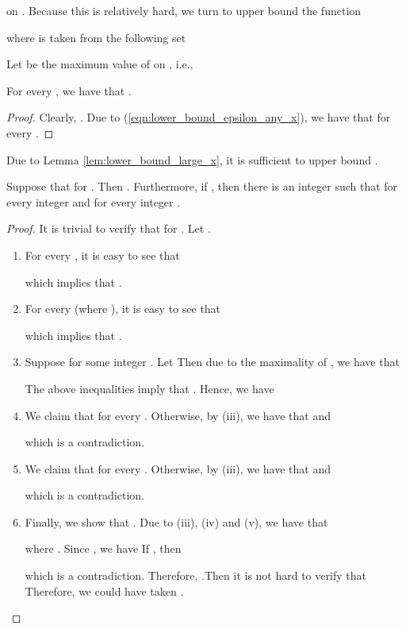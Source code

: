 \documentclass[JMC]{degruyter-journal}
\begin{document}
on . Because this  is relatively hard, we turn to upper
bound the function

where   is taken from the following set

Let  be the maximum value of  on ,
i.e.,



\begin{lemma}\label{lem:lower_bound_large_x}
For every , we have that .
\end{lemma}
\begin{proof}
Clearly, . Due to
 (\ref{eqn:lower_bound_epsilon_any_x}), we have that
 for
every .
\end{proof}

Due to Lemma \ref{lem:lower_bound_large_x}, it is sufficient  to
upper bound .
\begin{lemma}\label{lem:omega_maximality}
Suppose that  for
. Then  .
Furthermore, if , then there is an integer  such
that  for every integer  and  for
every integer     .
\end{lemma}
\begin{proof}
It is trivial to verify that  for . Let .

\begin{enumerate}
\item  For every , it is easy to see that

which implies that  .


\item For every  (where ), it is easy to see that

which implies that .



\item Suppose   for some integer .  Let
 Then due to the maximality of
, we have that


The above inequalities  imply that
. Hence, we have
 



\item We claim that  for every . Otherwise, by (iii), we have that  and

which is a contradiction.



\item We claim  that  for every . Otherwise, by (iii), we have that  and

which is a contradiction.

\item
Finally, we show that  . Due to (iii), (iv) and (v), we have that

where .
Since , we have
  If , then

which is a contradiction. Therefore, .Then it is not
hard to verify that
 Therefore,  we
could have taken .
\end{enumerate}
\end{proof}
\end{document}
